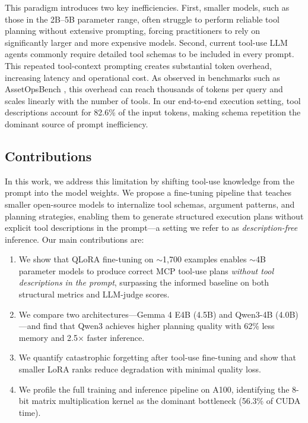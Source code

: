 \documentclass[conference]{IEEEtran}
\begin{document}
This paradigm introduces two key inefficiencies. First, smaller models, such as those in the 2B--5B parameter range, often struggle to perform reliable tool planning without extensive prompting, forcing practitioners to rely on significantly larger and more expensive models. Second, current tool-use LLM agents commonly require detailed tool schemas to be included in every prompt. This repeated tool-context prompting creates substantial token overhead, increasing latency and operational cost. As observed in benchmarks such as AssetOpsBench \cite{b2}, this overhead can reach thousands of tokens per query and scales linearly with the number of tools. In our end-to-end execution setting, tool descriptions account for 82.6\% of the input tokens, making schema repetition the dominant source of prompt inefficiency.

\subsection{Contributions}

In this work, we address this limitation by shifting tool-use knowledge from the prompt into the model weights. We propose a fine-tuning pipeline that teaches smaller open-source models to internalize tool schemas, argument patterns, and planning strategies, enabling them to generate structured execution plans without explicit tool descriptions in the prompt---a setting we refer to as \emph{description-free} inference. Our main contributions are:

\begin{enumerate}[leftmargin=*, topsep=2pt, itemsep=1pt]
\item We show that QLoRA fine-tuning on $\sim$1,700 examples enables $\sim$4B parameter models to produce correct MCP tool-use plans \emph{without tool descriptions in the prompt}, surpassing the informed baseline on both structural metrics and LLM-judge scores.
\item We compare two architectures---Gemma 4 E4B (4.5B) and Qwen3-4B (4.0B)---and find that Qwen3 achieves higher planning quality with 62\% less memory and 2.5$\times$ faster inference.
\item We quantify catastrophic forgetting after tool-use fine-tuning and show that smaller LoRA ranks reduce degradation with minimal quality loss.
\item We profile the full training and inference pipeline on A100, identifying the 8-bit matrix multiplication kernel as the dominant bottleneck (56.3\% of CUDA time).
\end{enumerate}
\end{document}
